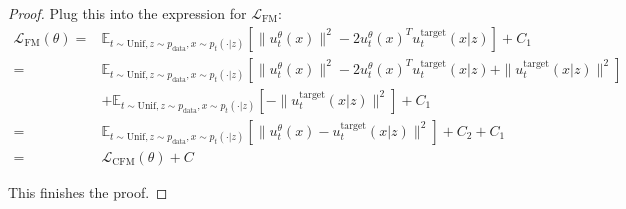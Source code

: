 \begin{proof}
    
    Plug this into the expression for $\mathcal{L}_{\text{FM}}$:
    \begin{equation}
        \begin{aligned}
    \mathcal{L}_{\text{FM}}(\theta)
    =& \mathbb{E}_{t \sim \text{Unif}, z \sim p_{\text{data}}, x \sim p_t(\cdot | z)} \left[ \|u_t^\theta(x)\|^2 - 2 u_t^\theta(x)^T u_t^{\text{target}}(x|z) \right] + C_1\\
    = &\mathbb{E}_{t \sim \text{Unif}, z \sim p_{\text{data}}, x \sim p_t(\cdot | z)} \left[ \|u_t^\theta(x)\|^2 - 2 u_t^\theta(x)^T u_t^{\text{target}}(x|z) + \|u_t^{\text{target}}(x|z)\|^2 \right]\\
    &+ \mathbb{E}_{t \sim \text{Unif}, z \sim p_{\text{data}}, x \sim p_t(\cdot | z)} \left[ - \|u_t^{\text{target}}(x|z)\|^2 \right] + C_1\\
    =& \mathbb{E}_{t \sim \text{Unif}, z \sim p_{\text{data}}, x \sim p_t(\cdot | z)} \left[ \|u_t^\theta(x) - u_t^{\text{target}}(x|z)\|^2 \right] + C_2 + C_1\\
    =& \mathcal{L}_{\text{CFM}}(\theta) + C
    \end{aligned}
    \end{equation}
    
    This finishes the proof.
\end{proof}


